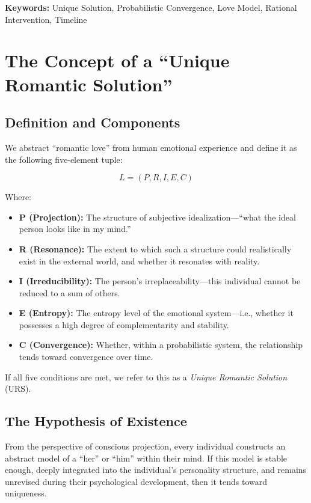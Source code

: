 \documentclass[12pt]{article}
\begin{document}
\medskip
\noindent\textbf{Keywords:} Unique Solution, Probabilistic Convergence, Love Model, Rational Intervention, Timeline

\newpage

\section{The Concept of a ``Unique Romantic Solution''}

\subsection{Definition and Components}

We abstract ``romantic love'' from human emotional experience and define it as the following five-element tuple:

\[
L = (P, R, I, E, C)
\]

Where:

\begin{itemize}
  \item \textbf{P (Projection):} The structure of subjective idealization—``what the ideal person looks like in my mind.''
  \item \textbf{R (Resonance):} The extent to which such a structure could realistically exist in the external world, and whether it resonates with reality.
  \item \textbf{I (Irreducibility):} The person’s irreplaceability—this individual cannot be reduced to a sum of others.
  \item \textbf{E (Entropy):} The entropy level of the emotional system—i.e., whether it possesses a high degree of complementarity and stability.
  \item \textbf{C (Convergence):} Whether, within a probabilistic system, the relationship tends toward convergence over time.
\end{itemize}

If all five conditions are met, we refer to this as a \textit{Unique Romantic Solution} (URS).
\subsection{The Hypothesis of Existence}

From the perspective of conscious projection, every individual constructs an abstract model of a ``her'' or ``him'' within their mind. If this model is stable enough, deeply integrated into the individual's personality structure, and remains unrevised during their psychological development, then it tends toward uniqueness.
\end{document}
